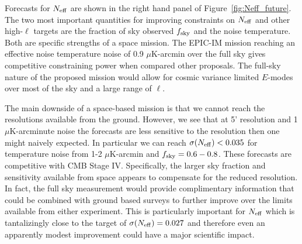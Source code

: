 Forecasts for ${N_{\rm eff}}$ are shown in the right hand panel of Figure~\ref{fig:Neff_future}.  The two most important quantities for improving 
constraints on ${N_{\rm eff}}$ and other high-$\ell$ targets are the fraction of sky observed $f_{\rm sky}$ and the noise temperature. Both are 
specific strengths of a space mission. The EPIC-IM mission reaching 
an effective noise temperature noise of 0.9 $\mu$K-arcmin over the full sky gives competitive constraining power when compared other proposals.  
The full-sky nature of the proposed mission would allow for cosmic variance limited $E$-modes over most of the sky and a large range of $\ell$.

The main downside of a space-based mission is that we cannot reach the resolutions available from the ground.  However, 
we see that at 5' resolution and 1 $\mu$K-arcminute noise the forecasts are less sensitive to the resolution then one might naively 
expected.  In particular we can reach $\sigma({N_{\rm eff}}) < 0.035$ for temperature noise from 1-2 $\mu$K-arcmin and $f_{\rm sky} =0.6-0.8$.  
These forecasts are competitive with CMB Stage IV.  Specifically, the larger sky fraction and sensitivity available from space appears 
to compensate for the reduced resolution.  In fact, the full sky measurement would provide complimentary information that could be 
combined with ground based surveys to further improve over the limits available from either experiment.  This is particularly important for 
${N_{\rm eff}}$ which is tantalizingly close to the target of $\sigma({N_{\rm eff}}) =0.027$ and therefore even an apparently modest improvement 
could have a major scientific impact.  




